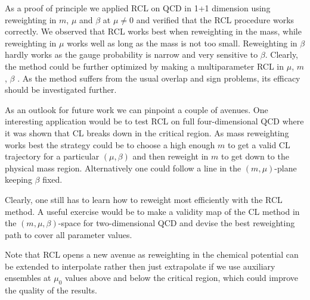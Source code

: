 \documentclass{PoS}
\begin{document}
As a proof of principle we applied RCL on QCD in 1+1 dimension using reweighting in $m$, $\mu$ and $\beta$ at $\mu\neq 0$ and verified that the RCL procedure works correctly. We observed that RCL works best when reweighting in the mass, while reweighting in $\mu$ works well as long as the mass is not too small. Reweighting in $\beta$ hardly works as the gauge probability is narrow and very sensitive to $\beta$. Clearly, the method could be further optimized by making a multiparameter RCL in $\mu$, $m$, $\beta$ \cite{Fodor:2001au}.
As the method suffers from the usual overlap and sign problems, its efficacy should be investigated further.


As an outlook for future work we can pinpoint a couple of avenues. One interesting application would be to test RCL on full four-dimensional QCD where it was shown that CL breaks down in the critical region. As mass reweighting works best the strategy could be to choose a high enough $m$ to get a valid CL trajectory for a particular $(\mu,\beta)$ and then reweight in $m$ to get down to the physical mass region. Alternatively one could follow a line in the $(m,\mu)$-plane keeping $\beta$ fixed. 

Clearly, one still has to learn how to reweight most efficiently with the RCL method. A useful exercise would be to make a validity map of the CL method in the $(m,\mu,\beta)$-space for two-dimensional QCD and devise the best reweighting path to cover all parameter values.

Note that RCL opens a new avenue as reweighting in the chemical potential can be extended to interpolate rather then just extrapolate if we use auxiliary ensembles at $\mu_0$ values above and below the critical region, which could improve the quality of the results.





\end{document}

